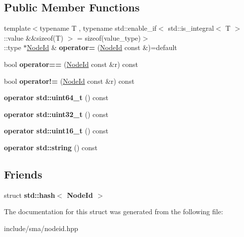\subsection*{Public Member Functions}
\begin{DoxyCompactItemize}
\item 
\hypertarget{structsma_1_1NodeId_ad7fbb134091a71ac0da11da29e7eebfd}{{\footnotesize template$<$typename T , typename std\-::enable\-\_\-if$<$ std\-::is\-\_\-integral$<$ T $>$\-::value \&\&sizeof(\-T) $>$  = sizeof(value\-\_\-type)$>$ }\\\-::type $\ast$\hyperlink{structsma_1_1NodeId}{Node\-Id} \& {\bfseries operator=} (\hyperlink{structsma_1_1NodeId}{Node\-Id} const \&)=default}\label{structsma_1_1NodeId_ad7fbb134091a71ac0da11da29e7eebfd}

\item 
\hypertarget{structsma_1_1NodeId_a56db372577d1f02ad2c5cd4663cc3092}{bool {\bfseries operator==} (\hyperlink{structsma_1_1NodeId}{Node\-Id} const \&r) const }\label{structsma_1_1NodeId_a56db372577d1f02ad2c5cd4663cc3092}

\item 
\hypertarget{structsma_1_1NodeId_afbb14b857e41a6869b42dd8d68ebd949}{bool {\bfseries operator!=} (\hyperlink{structsma_1_1NodeId}{Node\-Id} const \&r) const }\label{structsma_1_1NodeId_afbb14b857e41a6869b42dd8d68ebd949}

\item 
\hypertarget{structsma_1_1NodeId_ab549f1f3c03d09d5c1f7a4a10ceac4dd}{{\bfseries operator std\-::uint64\-\_\-t} () const }\label{structsma_1_1NodeId_ab549f1f3c03d09d5c1f7a4a10ceac4dd}

\item 
\hypertarget{structsma_1_1NodeId_abd9a737860d66dc98e1c02589b3a399b}{{\bfseries operator std\-::uint32\-\_\-t} () const }\label{structsma_1_1NodeId_abd9a737860d66dc98e1c02589b3a399b}

\item 
\hypertarget{structsma_1_1NodeId_ab0f29c870c2d8db7f32815e49902b956}{{\bfseries operator std\-::uint16\-\_\-t} () const }\label{structsma_1_1NodeId_ab0f29c870c2d8db7f32815e49902b956}

\item 
\hypertarget{structsma_1_1NodeId_a5df5ee9e720a02c2be0a45ea283914ee}{{\bfseries operator std\-::string} () const }\label{structsma_1_1NodeId_a5df5ee9e720a02c2be0a45ea283914ee}

\end{DoxyCompactItemize}
\subsection*{Friends}
\begin{DoxyCompactItemize}
\item 
\hypertarget{structsma_1_1NodeId_a7b8015dab4fec84b715849906d4deebf}{struct {\bfseries std\-::hash$<$ Node\-Id $>$}}\label{structsma_1_1NodeId_a7b8015dab4fec84b715849906d4deebf}

\end{DoxyCompactItemize}


The documentation for this struct was generated from the following file\-:\begin{DoxyCompactItemize}
\item 
include/sma/nodeid.\-hpp\end{DoxyCompactItemize}
